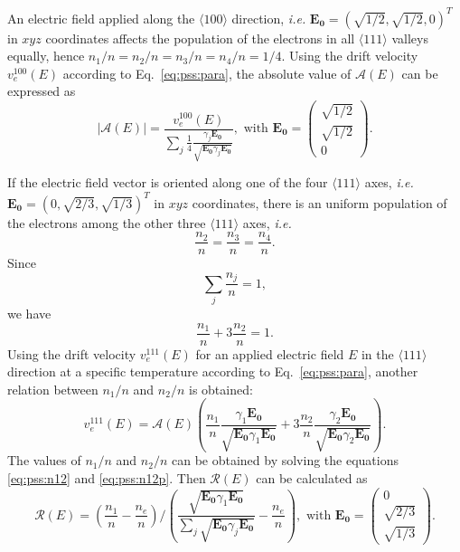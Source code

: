 An electric field applied along the $\langle 100 \rangle$ direction, \textit{i.e.} $\mathbf{E_{0}} = (\sqrt{1/2}, \sqrt{1/2}, 0)^{T}$ in $xyz$ coordinates affects the population of the electrons in all $\langle 111 \rangle$ valleys equally, hence $n_{1}/n = n_{2}/n = n_{3}/n = n_{4}/n = 1/4$. Using the drift velocity $v_{e}^{100}(E)$ according to Eq.~\ref{eq:pss:para}, the absolute value of $\mathcal{A}(E)$ can be expressed as
\begin{equation}
\label{eq:pss:ae}
|\mathcal{A}(E)| = \frac{v_{e}^{100}(E)}  {\displaystyle \sum_{j} \frac{1}{4} \frac{\gamma_{j}\mathbf{E_{0}}} {\sqrt{\mathbf{E_{0}}\gamma_{j}\mathbf{E_{0}}}}}, \mbox{ with } \mathbf{E_{0}} = \left( \begin{array}{c} 
\sqrt{1/2}\\\sqrt{1/2}\\0 \end{array} \right).
\end{equation}

If the electric field vector is oriented along one of the four $\langle 111 \rangle$ axes, \textit{i.e.} $\mathbf{E_{0}} = (0, \sqrt{2/3}, \sqrt{1/3})^{T}$ in $xyz$ coordinates, there is an uniform population of the electrons among the other three $\langle 111 \rangle$ axes, \textit{i.e.}
\begin{equation}
\label{eq:pss:n111}
\frac{n_{2}}{n} = \frac{n_{3}}{n} = \frac{n_{4}}{n}.
\end{equation}
Since
\begin{equation}
\label{eq:pss:nsum}
\displaystyle \sum_{j}\frac{n_{j}}{n} = 1,
\end{equation}
we have
\begin{equation}
\label{eq:pss:n12}
\frac{n_{1}}{n} + 3\frac{n_{2}}{n}= 1.
\end{equation}
Using the drift velocity $v_{e}^{111}(E)$ for an applied electric field $E$ in the $\langle 111 \rangle$ direction at a specific temperature according to Eq.~\ref{eq:pss:para}, another relation between $n_{1}/n$ and $n_{2}/n$ is obtained:
\begin{equation}
\label{eq:pss:n12p}
v_{e}^{111}(E) =  \mathcal{A}(E) \left(  \frac{n_{1}}{n} \frac{\gamma_{1}\mathbf{E_{0}}}         {\sqrt{\mathbf{E_{0}}\gamma_{1}\mathbf{E_{0}}}} +  3\frac{n_{2}}{n} \frac{\gamma_{2}\mathbf{E_{0}}}         {\sqrt{\mathbf{E_{0}}\gamma_{2}\mathbf{E_{0}}}} \right).
\end{equation}
The values of $n_{1}/n$ and $n_{2}/n$ can be obtained by solving the equations \ref{eq:pss:n12} and \ref{eq:pss:n12p}. Then $\mathcal{R}(E)$ can be calculated as
\begin{equation}
\label{eq:pss:re}
\mathcal{R}(E) = \left( \frac{n_{1}}{n} - \frac{n_{e}}{n} \right) / \left( \frac{\sqrt{\mathbf{E_{0}}\gamma_{1}\mathbf{E_{0}}}}
{\sum_{j}\sqrt{\mathbf{E_{0}}\gamma_{j}\mathbf{E_{0}}}} -       \frac{n_{e}}{n} \right), \mbox{ with } \mathbf{E_{0}} = \left( \begin{array}{c} 
0\\ \sqrt{2/3}\\\sqrt{1/3} \end{array} \right).
\end{equation}

